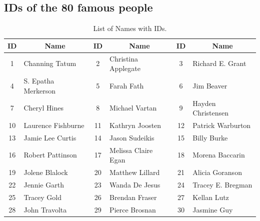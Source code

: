 \documentclass[11pt, a4paper]{article}
\numberwithin{equation}{subsection}
\begin{document}
\newpage
\begin{appendices}
\section{IDs of the 80 famous people}\label{appendix:80_people}
\begin{table}[htbp]
    \centering
    \label{tab:names}
    \caption{List of Names with IDs.}
    \begin{tabular}{|c|l|c|l|c|l|}
        \hline
        \textbf{ID} & \multicolumn{1}{c|}{\textbf{Name}} & \textbf{ID} & \multicolumn{1}{c|}{\textbf{Name}} & \textbf{ID} & \multicolumn{1}{c|}{\textbf{Name}} \\ \hline
        1           & Channing Tatum                      & 2           & Christina Applegate                 & 3           & Richard E. Grant                    \\ 
        4           & S. Epatha Merkerson                 & 5           & Farah Fath                          & 6           & Jim Beaver                          \\ 
        7           & Cheryl Hines                        & 8           & Michael Vartan                      & 9           & Hayden Christensen                  \\ 
        10          & Laurence Fishburne                  & 11          & Kathryn Joosten                     & 12          & Patrick Warburton                   \\ 
        13          & Jamie Lee Curtis                    & 14          & Jason Sudeikis                      & 15          & Billy Burke                         \\ 
        16          & Robert Pattinson                    & 17          & Melissa Claire Egan                 & 18          & Morena Baccarin                    \\ 
        19          & Jolene Blalock                      & 20          & Matthew Lillard                     & 21          & Alicia Goranson                    \\ 
        22          & Jennie Garth                        & 23          & Wanda De Jesus                      & 24          & Tracey E. Bregman                  \\ 
        25          & Tracey Gold                         & 26          & Brendan Fraser                      & 27          & Kellan Lutz                         \\ 
        28          & John Travolta                       & 29          & Pierce Brosnan                      & 30          & Jasmine Guy                        \\ 

\end{tabular}
\end{table}
\end{appendices}
\end{document}
